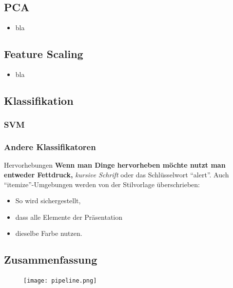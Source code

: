 \documentclass{beamer}
\begin{document}
\subsection{PCA}
\begin{frame}
  \begin{itemize}
    \item bla
  \end{itemize}
\end{frame}

\subsection{Feature Scaling}
\begin{frame}
  \begin{itemize}
    \item bla
  \end{itemize}
\end{frame}

\subsection{Klassifikation}
\subsubsection{SVM}
\subsubsection{Andere Klassifikatoren}
\begin{frame}
  \begin{block}{Hervorhebungen}
    \textbf{Wenn man Dinge hervorheben möchte nutzt man entweder Fettdruck,}
    \textit{ kursive Schrift} \alert{ oder das Schlüsselwort ``alert''}.
  Auch ``itemize''-Umgebungen werden von der Stilvorlage überschrieben:
  \end{block}
  \pause
  \begin{itemize}
    \item So wird sichergestellt,
    \item dass alle Elemente der Präsentation
    \item dieselbe Farbe nutzen.
  \end{itemize}
\end{frame}

\subsection{Zusammenfassung}
\begin{frame}[plain]
  \begin{figure}
    \texttt{[image: pipeline.png]}
  \end{figure}
\end{frame}
\end{document}
